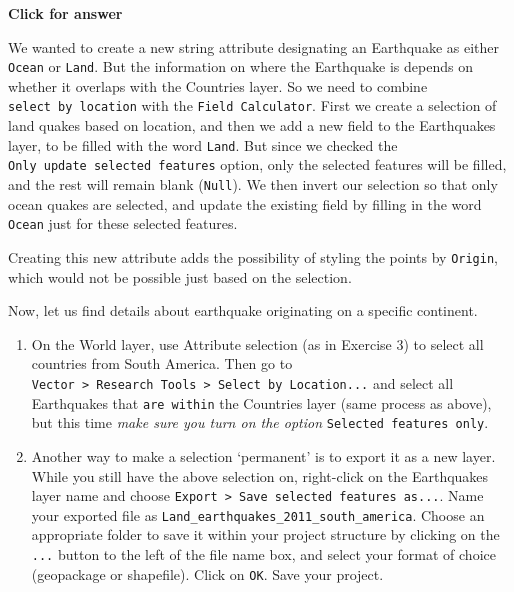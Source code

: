 \documentclass[
  letterpaper,
  DIV=11,
  numbers=noendperiod]{scrreprt}
\begin{document}
\begin{tcolorbox}[enhanced jigsaw, leftrule=.75mm, colframe=quarto-callout-important-color-frame, breakable, toprule=.15mm, bottomrule=.15mm, arc=.35mm, rightrule=.15mm, opacityback=0, colback=white, left=2mm]

\vspace{-3mm}\textbf{Click for answer}\vspace{3mm}

We wanted to create a new string attribute designating an Earthquake as
either \texttt{Ocean} or \texttt{Land}. But the information on where the
Earthquake is depends on whether it overlaps with the Countries layer.
So we need to combine \texttt{select\ by\ location} with the
\texttt{Field\ Calculator}. First we create a selection of land quakes
based on location, and then we add a new field to the Earthquakes layer,
to be filled with the word \texttt{Land}. But since we checked the
\texttt{Only\ update\ selected\ features} option, only the selected
features will be filled, and the rest will remain blank (\texttt{Null}).
We then invert our selection so that only ocean quakes are selected, and
update the existing field by filling in the word \texttt{Ocean} just for
these selected features.

Creating this new attribute adds the possibility of styling the points
by \texttt{Origin}, which would not be possible just based on the
selection.

\end{tcolorbox}

Now, let us find details about earthquake originating on a specific
continent.

\begin{enumerate}
\def\labelenumi{(\arabic{enumi})}
\setcounter{enumi}{115}
\item
  On the World layer, use Attribute selection (as in Exercise 3) to
  select all countries from South America. Then go to
  \texttt{Vector\ \textgreater{}\ Research\ Tools\ \textgreater{}\ Select\ by\ Location...}
  and select all Earthquakes that \texttt{are\ within} the Countries
  layer (same process as above), but this time \emph{make sure you turn
  on the option} \texttt{Selected\ features\ only}.
\item
  Another way to make a selection `permanent' is to export it as a new
  layer. While you still have the above selection on, right-click on the
  Earthquakes layer name and choose
  \texttt{Export\ \textgreater{}\ Save\ selected\ features\ as...}. Name
  your exported file as
  \texttt{Land\_earthquakes\_2011\_south\_america}. Choose an
  appropriate folder to save it within your project structure by
  clicking on the \texttt{...} button to the left of the file name box,
  and select your format of choice (geopackage or shapefile). Click on
  \texttt{OK}. Save your project.
\end{enumerate}
\end{document}

